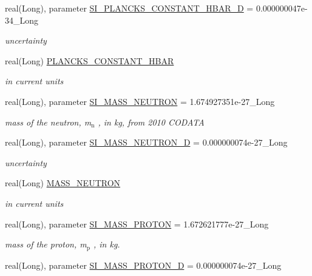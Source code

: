 \begin{DoxyCompactItemize}
real(Long), parameter \hyperlink{namespacephys__cons_af8ab82739d58ac3a1e1d9c97d3cfb4da}{SI\_\-PLANCKS\_\-CONSTANT\_\-HBAR\_\-D} = 0.000000047e-\/34\_\-Long
\begin{DoxyCompactList}\small\item\em uncertainty \item\end{DoxyCompactList}\item 
real(Long) \hyperlink{namespacephys__cons_af0b754235993060b14fc81b7d1f702a5}{PLANCKS\_\-CONSTANT\_\-HBAR}
\begin{DoxyCompactList}\small\item\em in current units \item\end{DoxyCompactList}\item 
real(Long), parameter \hyperlink{namespacephys__cons_ab117ad83bb79e4ed199d17f3c63ec4b3}{SI\_\-MASS\_\-NEUTRON} = 1.674927351e-\/27\_\-Long
\begin{DoxyCompactList}\small\item\em mass of the neutron, m$_{\mbox{n}}$ , in kg, from 2010 CODATA \item\end{DoxyCompactList}\item 
real(Long), parameter \hyperlink{namespacephys__cons_af635c94d544c5bc6dcb05186a9f81d84}{SI\_\-MASS\_\-NEUTRON\_\-D} = 0.000000074e-\/27\_\-Long
\begin{DoxyCompactList}\small\item\em uncertainty \item\end{DoxyCompactList}\item 
real(Long) \hyperlink{namespacephys__cons_abeff422917cc48601644e90ab12fb7c0}{MASS\_\-NEUTRON}
\begin{DoxyCompactList}\small\item\em in current units \item\end{DoxyCompactList}\item 
real(Long), parameter \hyperlink{namespacephys__cons_a6a740864089f117512dc89ea53f3dc5f}{SI\_\-MASS\_\-PROTON} = 1.672621777e-\/27\_\-Long
\begin{DoxyCompactList}\small\item\em mass of the proton, m$_{\mbox{p}}$ , in kg. \item\end{DoxyCompactList}\item 
real(Long), parameter \hyperlink{namespacephys__cons_a3c37a18a918519962cfc26597082d53d}{SI\_\-MASS\_\-PROTON\_\-D} = 0.000000074e-\/27\_\-Long

\end{DoxyCompactItemize}
